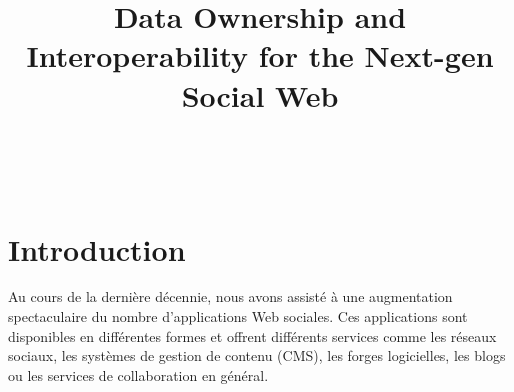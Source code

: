 \documentclass[a4paper]{article}
\begin{document}
\thispagestyle{empty}
\pagestyle{empty}


~
\newpage


\sloppy
\title{Data Ownership and Interoperability for the Next-gen Social Web}
\maketitle

\newpage

\tableofcontents


\newpage

\pagestyle{plain}
\section{Introduction}
\label{ch:intro}

Au cours de la dernière décennie, nous avons assisté à une augmentation spectaculaire du nombre d'applications Web sociales. Ces applications sont disponibles en différentes formes et offrent différents services comme les réseaux sociaux, les systèmes de gestion de contenu (CMS), les forges logicielles, les blogs ou les services de collaboration en général.\\
\end{document}
